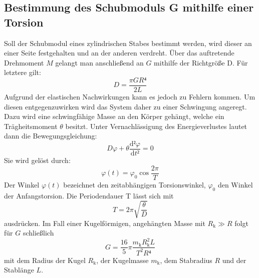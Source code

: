  \subsection{Bestimmung des Schubmoduls G mithilfe einer Torsion}
 Soll der Schubmodul eines zylindrischen Stabes bestimmt werden, wird dieser
  an einer Seite festgehalten und an der anderen verdreht. Über das auftretende
   Drehmoment $M$ gelangt man anschließend an $G$ mithilfe der Richtgröße D. Für letztere gilt:
   \begin{equation}
     D = \frac{\pi GR⁴}{2L}
   \end{equation}
Aufgrund der elastischen Nachwirkungen kann es jedoch zu Fehlern kommen.
Um diesen entgegenzuwirken wird das System daher zu einer Schwingung angeregt.
 Dazu wird eine schwingfähige Masse an den Körper gehängt, welche ein Trägheitsmoment $\theta$ besitzt.
Unter Vernachlässigung des Energieverlustes lautet dann die Bewegungsgleichung:
\begin{equation}
  D\varphi + \theta\frac{\text{d}²\varphi}{\text{d}t²} = 0
\end{equation}
Sie wird gelöst durch:
\begin{equation}
\varphi(t) = \varphi_0 \cos\frac{2\pi}{T}
\end{equation}
Der Winkel $\varphi(t)$ bezeichnet den zeitabhängigen Torsionswinkel,
 $\varphi_\text{0}$ den Winkel der Anfangstorsion. Die Periodendauer T lässt sich mit
\begin{equation}
  T = 2\pi\sqrt{\frac{\theta}{D}}
\end{equation}
ausdrücken. Im Fall einer Kugelförmigen, angehängten Masse mit $R_\text{k} \gg R$ folgt für $G$ schließlich
\begin{equation}
G = \frac{16}{5} \pi \frac{m_\text{k}R^2_\text{k}L}{T^2R⁴}
\end{equation}
mit dem Radius der Kugel $R_\text{k}$, der Kugelmasse $m_\text{k}$, dem Stabradius $R$ und der Stablänge $L$.

